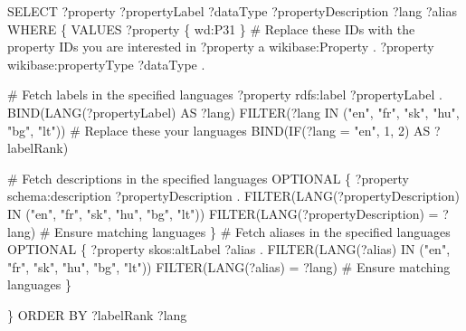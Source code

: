 \documentclass[
  letterpaper,
  DIV=11,
  numbers=noendperiod]{scrreprt}
\newenvironment{Shaded}{\begin{snugshade}}{\end{snugshade}}
\newcommand{\AttributeTok}[1]{\textcolor[rgb]{0.40,0.45,0.13}{#1}}
\newcommand{\CommentTok}[1]{\textcolor[rgb]{0.37,0.37,0.37}{#1}}
\newcommand{\DecValTok}[1]{\textcolor[rgb]{0.68,0.00,0.00}{#1}}
\newcommand{\FunctionTok}[1]{\textcolor[rgb]{0.28,0.35,0.67}{#1}}
\newcommand{\NormalTok}[1]{\textcolor[rgb]{0.00,0.23,0.31}{#1}}
\newcommand{\OtherTok}[1]{\textcolor[rgb]{0.00,0.23,0.31}{#1}}
\newcommand{\SpecialCharTok}[1]{\textcolor[rgb]{0.37,0.37,0.37}{#1}}
\newcommand{\StringTok}[1]{\textcolor[rgb]{0.13,0.47,0.30}{#1}}
\begin{document}
\begin{Shaded}
\begin{Highlighting}[]
\NormalTok{SELECT ?property ?propertyLabel ?dataType ?propertyDescription ?lang ?alias WHERE \{}
\NormalTok{  VALUES ?property \{ wd}\SpecialCharTok{:}\NormalTok{P31 \}  }\CommentTok{\# Replace these IDs with the property IDs you are interested in}
\NormalTok{  ?property a wikibase}\SpecialCharTok{:}\NormalTok{Property .}
\NormalTok{  ?property wikibase}\SpecialCharTok{:}\NormalTok{propertyType ?dataType .}

  \CommentTok{\# Fetch labels in the specified languages}
\NormalTok{  ?property rdfs}\SpecialCharTok{:}\NormalTok{label ?propertyLabel .}
  \FunctionTok{BIND}\NormalTok{(}\FunctionTok{LANG}\NormalTok{(?propertyLabel) AS ?lang)}
  \FunctionTok{FILTER}\NormalTok{(?lang }\FunctionTok{IN}\NormalTok{ (}\StringTok{"en"}\NormalTok{, }\StringTok{"fr"}\NormalTok{, }\StringTok{"sk"}\NormalTok{, }\StringTok{"hu"}\NormalTok{, }\StringTok{"bg"}\NormalTok{, }\StringTok{"lt"}\NormalTok{))  }\CommentTok{\# Replace these your languages}
  \FunctionTok{BIND}\NormalTok{(}\FunctionTok{IF}\NormalTok{(?}\AttributeTok{lang =} \StringTok{"en"}\NormalTok{, }\DecValTok{1}\NormalTok{, }\DecValTok{2}\NormalTok{) AS ?labelRank)}

  \CommentTok{\# Fetch descriptions in the specified languages}
\NormalTok{  OPTIONAL \{}
\NormalTok{    ?property schema}\SpecialCharTok{:}\NormalTok{description ?propertyDescription .}
    \FunctionTok{FILTER}\NormalTok{(}\FunctionTok{LANG}\NormalTok{(?propertyDescription) }\FunctionTok{IN}\NormalTok{ (}\StringTok{"en"}\NormalTok{, }\StringTok{"fr"}\NormalTok{, }\StringTok{"sk"}\NormalTok{, }\StringTok{"hu"}\NormalTok{, }\StringTok{"bg"}\NormalTok{, }\StringTok{"lt"}\NormalTok{))}
    \FunctionTok{FILTER}\NormalTok{(}\FunctionTok{LANG}\NormalTok{(?propertyDescription) }\OtherTok{=}\NormalTok{ ?lang)  }\CommentTok{\# Ensure matching languages}
\NormalTok{  \}}
  \CommentTok{\# Fetch aliases in the specified languages}
\NormalTok{  OPTIONAL \{}
\NormalTok{  ?property skos}\SpecialCharTok{:}\NormalTok{altLabel ?alias .}
  \FunctionTok{FILTER}\NormalTok{(}\FunctionTok{LANG}\NormalTok{(?alias) }\FunctionTok{IN}\NormalTok{ (}\StringTok{"en"}\NormalTok{, }\StringTok{"fr"}\NormalTok{, }\StringTok{"sk"}\NormalTok{, }\StringTok{"hu"}\NormalTok{, }\StringTok{"bg"}\NormalTok{, }\StringTok{"lt"}\NormalTok{))}
  \FunctionTok{FILTER}\NormalTok{(}\FunctionTok{LANG}\NormalTok{(?alias) }\OtherTok{=}\NormalTok{ ?lang)  }\CommentTok{\# Ensure matching languages}
\NormalTok{  \}}

\NormalTok{\}}
\NormalTok{ORDER BY ?labelRank ?lang}
\end{Highlighting}
\end{Shaded}
\end{document}
